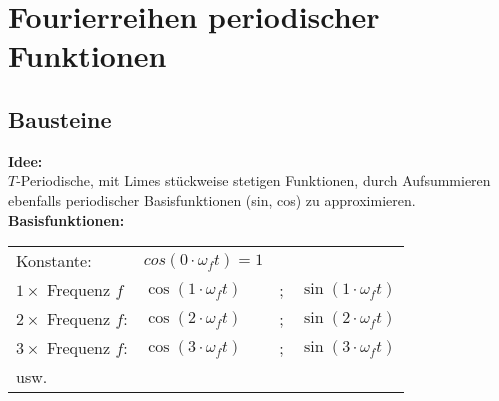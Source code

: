 \section{Fourierreihen periodischer Funktionen}
	\subsection{Bausteine}
		\textbf{Idee:}\\[3pt]
		$T$-Periodische, mit Limes stückweise stetigen Funktionen, durch Aufsummieren ebenfalls periodischer Basisfunktionen
		(sin, cos) zu approximieren.\\[3pt]

		\textbf{Basisfunktionen:}\\[3pt]
		\begin{minipage}[b]{0.5\textwidth}
			\begin{tabular}{llll}
				Konstante: & $cos(0 \cdot \omega_{f} t) = 1$ & &\\[3pt]
				$1 \times$ Frequenz $f$  & $\cos(1 \cdot \omega_{f} t)$ & ; & $\sin(1 \cdot \omega_{f} t)$\\[3pt]
				$2 \times$ Frequenz $f$: & $\cos(2 \cdot \omega_{f} t)$ & ; & $\sin(2 \cdot \omega_{f} t)$\\[3pt]
				$3 \times$ Frequenz $f$: & $\cos(3 \cdot \omega_{f} t)$ & ; & $\sin(3 \cdot \omega_{f} t)$\\[3pt]
				usw. & & &\\[3pt]
			\end{tabular}
		\end{minipage}
		\begin{minipage}[]{0.5\textwidth}
			\scalebox{0.8}{}
		\end{minipage}\\[3pt]
	
